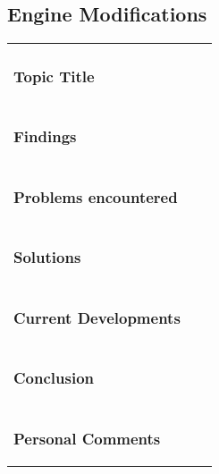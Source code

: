 \documentclass[12pt,a4paper,numbers=noenddot]{scrartcl}
\begin{document}
\newpage
\subsection{Engine Modifications}
\begin{xtabular}{|p{3.8cm}|p{8.3cm}|p{4.2cm}|}
	\vspace*{-1.25\baselineskip}\subsubsection{Topic Title}
	& 
	
	& 
	\\
	\vspace*{-1.25\baselineskip}\subsubsection{Findings}
	& 
	
	&
	\\
	\vspace*{-1.25\baselineskip}\subsubsection{Problems encountered}
	& 
	
	&
	\\
	\vspace*{-1.25\baselineskip}\subsubsection{Solutions}
	& 
	
	&
	\\
	\vspace*{-1.25\baselineskip}\subsubsection{Current Developments}
	& 
	
	&
	\\
	\vspace*{-1.25\baselineskip}\subsubsection{Conclusion}
	& 
	
	&
	\\
	\vspace*{-1.25\baselineskip}\subsubsection{Personal Comments}
	& 
	
	&
	\\
	\hline
\end{xtabular}
\end{document}
